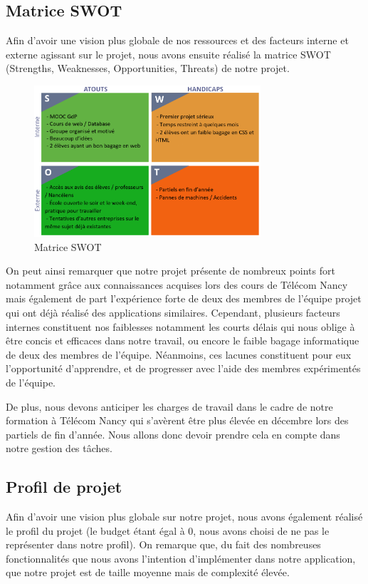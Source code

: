 \documentclass[french,a4paper]{article}
\begin{document}
\subsection{Matrice SWOT}
Afin d’avoir une vision plus globale de nos ressources et des facteurs interne et externe agissant sur le projet, nous avons ensuite réalisé la matrice SWOT (Strengths, Weaknesses, Opportunities, Threats) de notre projet.

\begin{figure}[H]
    \centering
    \includegraphics[width=0.75\textwidth]{img/SWOT.png}
    \caption{Matrice SWOT}
\end{figure}

On peut ainsi remarquer que notre projet présente de nombreux points fort notamment grâce aux connaissances acquises lors des cours de Télécom Nancy mais également de part l’expérience forte de deux des membres de l’équipe projet qui ont déjà réalisé des applications similaires.  Cependant, plusieurs facteurs internes constituent nos faiblesses notamment les courts délais qui nous oblige à être concis et efficaces dans notre travail, ou encore le faible bagage informatique de deux des membres de l’équipe. Néanmoins, ces lacunes constituent pour eux l’opportunité d’apprendre, et de progresser avec l’aide des membres expérimentés de l’équipe.

De plus, nous devons anticiper les charges de travail dans le cadre de notre formation à Télécom Nancy qui s'avèrent être plus élevée en décembre lors des partiels de fin d'année. Nous allons donc devoir prendre cela en compte dans notre gestion des tâches.

\subsection{Profil de projet}
Afin d’avoir une vision plus globale sur notre projet, nous avons également réalisé le profil du projet (le budget étant égal à 0, nous avons choisi de ne pas le représenter dans notre profil). On remarque que, du fait des nombreuses fonctionnalités que nous avons l’intention d’implémenter dans notre application, que notre projet est de taille moyenne mais de complexité élevée.
\end{document}
